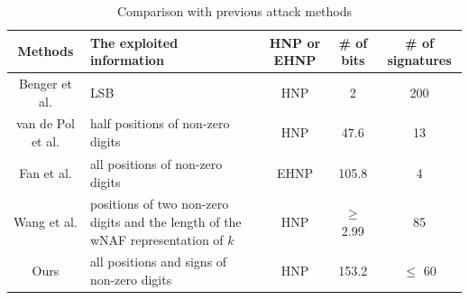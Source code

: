 



\begin{table}[!t]
  \centering
   \caption{Comparison with previous attack methods}\label{compare1}
\begin{tabular}{|c|m{90pt}|c|c|c|}
  \hline
  Methods & The exploited information & HNP or EHNP & \# of bits & \# of signatures \\
  \hline
  Benger et al. \cite{Benger2014} & LSB & HNP & 2 & 200 \\
  \hline
  van de Pol et al. \cite{Van2015} & half positions of non-zero digits & HNP & 47.6 & 13 \\
  \hline
  Fan et al. \cite{Fan2016} & all positions of non-zero digits & EHNP & 105.8 & 4 \\
  \hline
  Wang et al. \cite{Wang2017} & positions of two non-zero digits and the length of the wNAF representation of $k$ & HNP & $\geq$ 2.99 & 85 \\
  \hline
  Ours & all positions and signs of non-zero digits & HNP & 153.2  & $\leq$ 60 \\
  \hline
\end{tabular}
\end{table}

